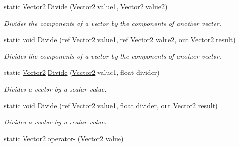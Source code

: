 \begin{DoxyCompactItemize}
static \hyperlink{struct_microsoft_1_1_xna_1_1_framework_1_1_vector2}{Vector2} \hyperlink{struct_microsoft_1_1_xna_1_1_framework_1_1_vector2_a80825404a896177105acdcc14183b20c}{Divide} (\hyperlink{struct_microsoft_1_1_xna_1_1_framework_1_1_vector2}{Vector2} value1, \hyperlink{struct_microsoft_1_1_xna_1_1_framework_1_1_vector2}{Vector2} value2)
\begin{DoxyCompactList}\small\item\em Divides the components of a vector by the components of another vector.\end{DoxyCompactList}\item 
static void \hyperlink{struct_microsoft_1_1_xna_1_1_framework_1_1_vector2_a34b590153d9cfd3da7d4c29cf81b8795}{Divide} (ref \hyperlink{struct_microsoft_1_1_xna_1_1_framework_1_1_vector2}{Vector2} value1, ref \hyperlink{struct_microsoft_1_1_xna_1_1_framework_1_1_vector2}{Vector2} value2, out \hyperlink{struct_microsoft_1_1_xna_1_1_framework_1_1_vector2}{Vector2} result)
\begin{DoxyCompactList}\small\item\em Divides the components of a vector by the components of another vector.\end{DoxyCompactList}\item 
static \hyperlink{struct_microsoft_1_1_xna_1_1_framework_1_1_vector2}{Vector2} \hyperlink{struct_microsoft_1_1_xna_1_1_framework_1_1_vector2_a04e7a5bdf518e16d90f9ade090598e8a}{Divide} (\hyperlink{struct_microsoft_1_1_xna_1_1_framework_1_1_vector2}{Vector2} value1, float divider)
\begin{DoxyCompactList}\small\item\em Divides a vector by a scalar value.\end{DoxyCompactList}\item 
static void \hyperlink{struct_microsoft_1_1_xna_1_1_framework_1_1_vector2_adc4051426161db34dd495a9bfad6332b}{Divide} (ref \hyperlink{struct_microsoft_1_1_xna_1_1_framework_1_1_vector2}{Vector2} value1, float divider, out \hyperlink{struct_microsoft_1_1_xna_1_1_framework_1_1_vector2}{Vector2} result)
\begin{DoxyCompactList}\small\item\em Divides a vector by a scalar value.\end{DoxyCompactList}\item 
static \hyperlink{struct_microsoft_1_1_xna_1_1_framework_1_1_vector2}{Vector2} \hyperlink{struct_microsoft_1_1_xna_1_1_framework_1_1_vector2_a9e60bd85e07bf1f47ec9ab5ab83b45dd}{operator-\/} (\hyperlink{struct_microsoft_1_1_xna_1_1_framework_1_1_vector2}{Vector2} value)

\end{DoxyCompactItemize}
